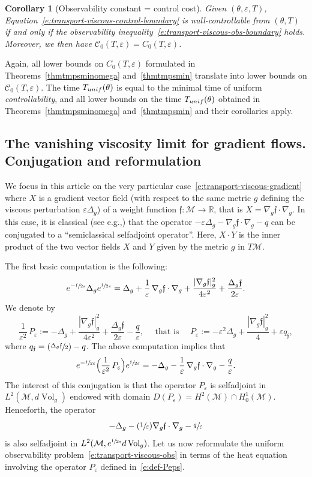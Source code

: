 \documentclass[11pt]{article}
\newcommand{\eg}{e.g.,\xspace}
\newcommand{\Subsection}{\subsection}
\numberwithin{equation}{section}
\newcommand{\unif}{\textup{unif}}
\newcommand{\Psfrac}[2]{(\sfrac{#1}{#2})}
\newtheorem{corollary}[lemma]{Corollary}
\theoremstyle{definition}
\newcommand{\M}{\ensuremath{\mathcal M}}
\newcommand{\calC}{\ensuremath{\mathcal C}}
\newcommand{\mb}[1]{\ensuremath{\mathbb{#1}}}
\newcommand{\R}{{\mb{R}}}
\newcommand{\f}{\ensuremath{\mathfrak{f}}}
\DeclareMathOperator{\Vol}{Vol}
\newcommand\Lap{\Delta_{g}}
\newcommand\nablag{\nabla_{g}}
\let\eps\varepsilon
\let\q q
\newcommand{\qf}{q_{\f}}
\begin{document}
\begin{corollary}[Observability constant = control cost]
Given $(\theta, \eps, T)$, Equation~\eqref{e:transport-viscous-control-boundary} is null-controllable from $(\theta, T)$ if and only if the observability inequality~\eqref{e:transport-viscous-obs-boundary} holds.
Moreover, we then have $\mathcal{C}_0(T,\eps)= C_0(T,\eps)$.
\end{corollary}
Again, all lower bounds on $C_0(T,\eps)$ formulated in Theorems~\ref{thmtmpsminomega} and~\ref{thmtmpsmin} translate into lower bounds on $\calC_0(T,\eps)$. The time $T_{\unif}(\theta)$ is equal to the minimal time of uniform {\em controllability}, and all lower bounds on the time $T_{\unif}(\theta)$ obtained in Theorems~\ref{thmtmpsminomega} and~\ref{thmtmpsmin} and their corollaries apply.

\Subsection{The vanishing viscosity limit for gradient flows. Conjugation and reformulation}
\label{sectconjug}

We focus in this article on the very particular case~\eqref{e:transport-viscous-gradient} where $X$ is a gradient vector field (with respect to the same metric $g$ defining the viscous perturbation $\eps \Lap$) of a weight function $\f : \M\to \R$, that is $X = \nablag \f \cdot \nablag$. In this case, it is classical (see \eg \cite{Witten:82,HS:85}) that the operator $-\eps \Lap - \nablag \f \cdot \nablag-\q$ can be conjugated to a ``semiclassical selfadjoint operator''. Here, $X\cdot Y$ is the inner product of the two vector fields $X$ and $Y$ given by the metric $g$ in $T\M$.

The first basic computation is the following:
\[
e^{-\sfrac{\f}{2\eps}} \Lap e^{\sfrac{\f}{2\eps}} = \Lap + \frac{1}{\eps}\,\nablag \f \cdot \nablag + \frac{|\nablag \f|_g^2}{4\eps^2} + \frac{\Lap \f}{2\eps}.
\]
We denote by
\begin{equation}
\label{e:def-Peps}
\frac{1}{\eps^2}\,P_\eps := - \Lap + \frac{|\nablag \f|_g^2}{4\eps^2} + \frac{\Lap \f}{2\eps}-\frac{ \q}{\eps}, \quad \text{ that is } \quad P_\eps := - \eps^2 \Lap + \frac{|\nablag \f|_g^2}{4} + \eps \qf,
\end{equation}
where $\qf= \Psfrac{\Lap \f}{2}-\q$. The above computation implies that
\begin{equation}
\label{e:trans-eps}
e^{-\sfrac{\f}{2\eps}} \Bigl( \frac{1}{\eps^2}\,P_\eps \Bigr)e^{\sfrac{\f}{2\eps}} = - \Lap - \frac{1}{\eps}\,\nablag \f \cdot \nablag-\frac{\q}{\eps}.
\end{equation}
The interest of this conjugation is that the operator $P_\eps$ is selfadjoint in $L^2(\M,d\Vol_g)$ endowed with domain $D(P_\eps) = H^2(\M)\cap H^1_0(\M)$. Henceforth, the operator
\[
- \Lap - \Psfrac{1}{\eps}\nablag \f \cdot \nablag-\sfrac{\q}{\eps}
\]
is also selfadjoint in $L^2(\M, e^{\sfrac{\f}{2\eps}} d\Vol_g)$.
Let us now reformulate the uniform observability problem~\eqref{e:transport-viscous-obs} in terms of the heat equation involving the operator $P_\eps$ defined in~\eqref{e:def-Peps}.
\end{document}
